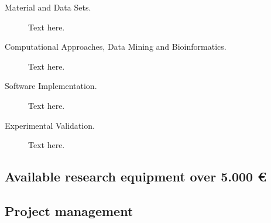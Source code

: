 \documentclass[11pt,a4paper]{article}
\begin{document}
\begin{description}


	\item[Material and Data Sets.] Text here.
	\item[Computational Approaches, Data Mining and Bioinformatics.] Text here.
	\item[Software Implementation.] Text here.
	\item[Experimental Validation.] Text here.
\end{description}

\subsection{Available research equipment over 5.000 €}

\subsection{Project management}
\end{document}
